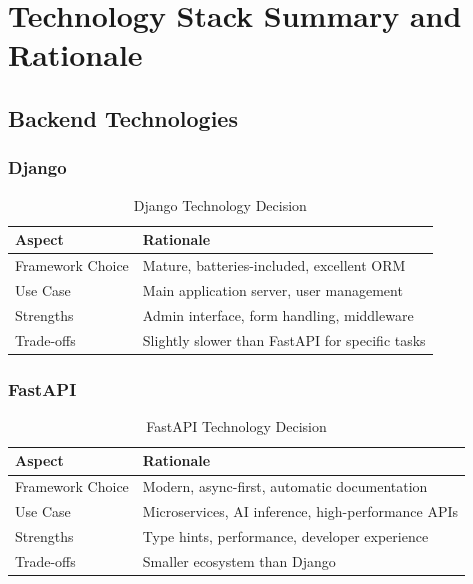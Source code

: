 \documentclass[12pt,a4paper]{report}
\begin{document}
\newpage

\chapter{Technology Stack Summary and Rationale}

\section{Backend Technologies}

\subsection{Django}

\begin{table}[H]
\centering
\small
\begin{tabular}{|l|p{5cm}|}
\hline
\textbf{Aspect} & \textbf{Rationale} \\
\hline
Framework Choice & Mature, batteries-included, excellent ORM \\
Use Case & Main application server, user management \\
Strengths & Admin interface, form handling, middleware \\
Trade-offs & Slightly slower than FastAPI for specific tasks \\
\hline
\end{tabular}
\caption{Django Technology Decision}
\end{table}

\subsection{FastAPI}

\begin{table}[H]
\centering
\small
\begin{tabular}{|l|p{5cm}|}
\hline
\textbf{Aspect} & \textbf{Rationale} \\
\hline
Framework Choice & Modern, async-first, automatic documentation \\
Use Case & Microservices, AI inference, high-performance APIs \\
Strengths & Type hints, performance, developer experience \\
Trade-offs & Smaller ecosystem than Django \\
\hline
\end{tabular}
\caption{FastAPI Technology Decision}
\end{table}
\end{document}
